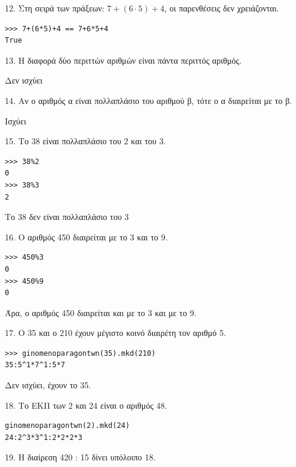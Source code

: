 \begin{exercise}
 12. Στη σειρά των πράξεων:  $7 + (6 \cdot 5) + 4$, οι παρενθέσεις δεν χρειάζονται.\end{exercise}

\begin{lstlisting}
>>> 7+(6*5)+4 == 7+6*5+4
True
\end{lstlisting}  

\begin{exercise}
 13. Η διαφορά δύο περιττών αριθμών είναι πάντα περιττός αριθμός.\end{exercise}

Δεν ισχύει
\begin{exercise}
 14. Αν ο αριθμός α είναι πολλαπλάσιο του αριθμού β, τότε ο α διαιρείται με το β.\end{exercise}

Ισχύει   
\begin{exercise}
 15.    Το 38 είναι πολλαπλάσιο του 2 και του 3.\end{exercise}

\begin{lstlisting}
>>> 38%2
0
>>> 38%3
2
\end{lstlisting}
Το 38 δεν είναι πολλαπλάσιο του 3

\begin{exercise}
 16. Ο αριθμός 450 διαιρείται με το 3 και το 9.\end{exercise}

\begin{lstlisting}
>>> 450%3
0
>>> 450%9
0
\end{lstlisting}
Άρα, ο αριθμός 450 διαιρείται και με το 3 και με το 9.

\begin{exercise}
 17. Ο 35 και ο 210 έχουν μέγιστο κοινό διαιρέτη τον αριθμό 5.\end{exercise}

\begin{lstlisting}
>>> ginomenoparagontwn(35).mkd(210)
35:5^1*7^1:5*7
\end{lstlisting}
Δεν ισχύει, έχουν το 35.
\begin{exercise}
 18. Το ΕΚΠ των 2 και 24 είναι ο αριθμός 48.\end{exercise}

\begin{lstlisting}
ginomenoparagontwn(2).mkd(24)
24:2^3*3^1:2*2*2*3
\end{lstlisting}
\begin{exercise}
 19. Η διαίρεση 420 : 15 δίνει υπόλοιπο 18.\end{exercise}

